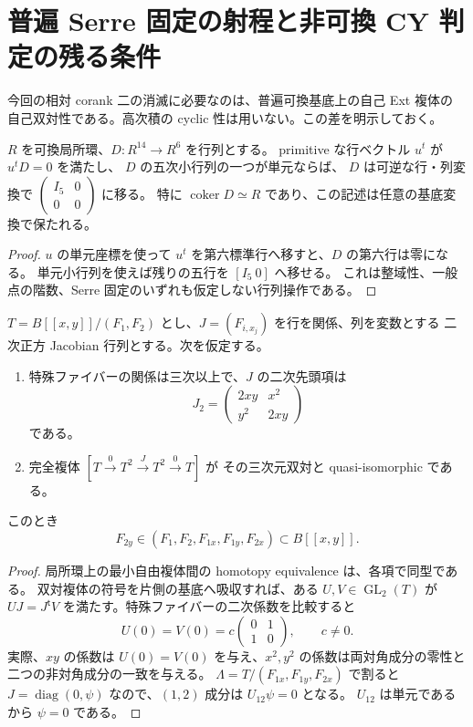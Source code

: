 \section{普遍 Serre 固定の射程と非可換 CY 判定の残る条件}

今回の相対 corank 二の消滅に必要なのは、普遍可換基底上の自己 Ext 複体の
自己双対性である。高次積の cyclic 性は用いない。この差を明示しておく。

\begin{lemma}
$R$ を可換局所環、$D:R^{14}\to R^6$ を行列とする。
primitive な行ベクトル $u^t$ が $u^tD=0$ を満たし、
$D$ の五次小行列の一つが単元ならば、
$D$ は可逆な行・列変換で
$\left(\begin{smallmatrix}I_5&0\\0&0\end{smallmatrix}\right)$ に移る。
特に $\operatorname{coker}D\simeq R$ であり、この記述は任意の基底変換で保たれる。
\end{lemma}
\begin{proof}
$u$ の単元座標を使って $u^t$ を第六標準行へ移すと、$D$ の第六行は零になる。
単元小行列を使えば残りの五行を $[I_5\ 0]$ へ移せる。
これは整域性、一般点の階数、Serre 固定のいずれも仮定しない行列操作である。
\end{proof}

\begin{lemma}
$T=B[[x,y]]/(F_1,F_2)$ とし、$J=(F_{i,x_j})$ を行を関係、列を変数とする
二次正方 Jacobian 行列とする。次を仮定する。
\begin{enumerate}
\item 特殊ファイバーの関係は三次以上で、$J$ の二次先頭項は
\[
J_2=\begin{pmatrix}2xy&x^2\\y^2&2xy\end{pmatrix}
\]
である。
\item 完全複体 $[T\xrightarrow0T^2\xrightarrow J T^2\xrightarrow0T]$ が
その三次元双対と quasi-isomorphic である。
\end{enumerate}
このとき
\[
F_{2y}\in(F_1,F_2,F_{1x},F_{1y},F_{2x})\subset B[[x,y]].
\]
\end{lemma}
\begin{proof}
局所環上の最小自由複体間の homotopy equivalence は、各項で同型である。
双対複体の符号を片側の基底へ吸収すれば、ある $U,V\in\operatorname{GL}_2(T)$ が
$UJ=J^{\mathsf t}V$ を満たす。特殊ファイバーの二次係数を比較すると
\[
U(0)=V(0)=c\begin{pmatrix}0&1\\1&0\end{pmatrix},\qquad c\ne0.
\]
実際、$xy$ の係数は $U(0)=V(0)$ を与え、$x^2,y^2$ の係数は両対角成分の零性と
二つの非対角成分の一致を与える。
$\Lambda=T/(F_{1x},F_{1y},F_{2x})$ で割ると
$J=\operatorname{diag}(0,\psi)$ なので、$(1,2)$ 成分は $U_{12}\psi=0$ となる。
$U_{12}$ は単元であるから $\psi=0$ である。
\end{proof}

